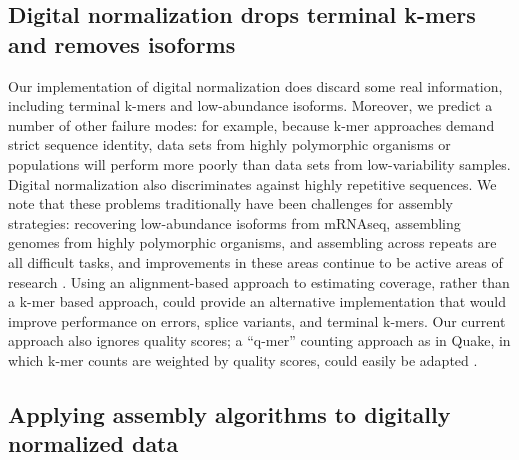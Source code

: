 \documentclass{pnastwo}
\begin{document}
\begin{article}
\subsection{Digital normalization drops terminal k-mers and removes isoforms}

Our implementation of digital normalization does discard some real
information, including terminal k-mers and low-abundance isoforms.
Moreover, we predict a number of other failure modes: for example,
because k-mer approaches demand strict sequence identity, data sets
from highly polymorphic organisms or populations will perform more
poorly than data sets from low-variability samples.  Digital
normalization also discriminates against highly repetitive
sequences. We note that these problems traditionally have been
challenges for assembly strategies: recovering low-abundance isoforms
from mRNAseq, assembling genomes from highly polymorphic organisms,
and assembling across repeats are all difficult tasks, and
improvements in these areas continue to be active areas of research
\cite{pubmed18549302,pubmed20633259,pubmed18541131}.  Using an
alignment-based approach to estimating coverage, rather than a k-mer
based approach, could provide an alternative implementation that would
improve performance on errors, splice variants, and terminal k-mers.
Our current approach also ignores quality scores; a ``q-mer'' counting
approach as in Quake, in which k-mer counts are weighted by quality
scores, could easily be adapted \cite{pubmed21114842}.


\subsection{Applying assembly algorithms to digitally normalized data}



\end{article}
\end{document}
